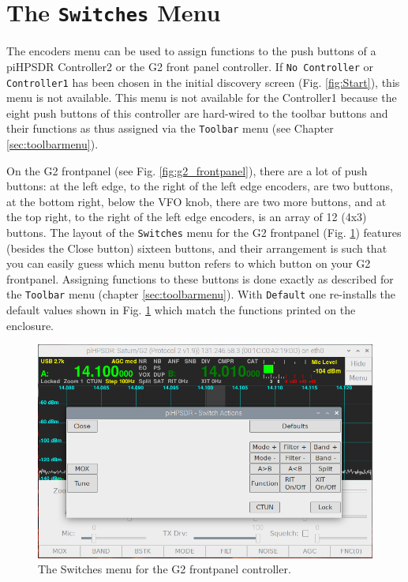 \documentclass[12pt]{book}
\def\rett#1{\texttt{\color{red}#1}}
\def\bltt#1{\texttt{\color{blue}#1}}
\begin{document}
\section{The \texttt{Switches} Menu}

The encoders menu can be used to assign functions to the push buttons of a
piHPSDR  Controller2 or the G2 front panel controller.
If \texttt{No Controller} or \texttt{Controller1} has been chosen in the initial discovery screen
(Fig. \ref{fig:Start}), this menu is not available. This menu is not available
for the Controller1 because the eight push buttons of this controller are hard-wired to
the toolbar buttons and their functions as thus assigned via the \bltt{Toolbar} menu
(see Chapter \ref{sec:toolbarmenu}).

On the G2 frontpanel (see Fig. \ref{fig:g2_frontpanel}),
 there are a lot of push buttons: at the left edge, to the right
of the left edge encoders, are two buttons, at the bottom right, below the VFO knob,
there are two more buttons, and at the top right, to the right of the left edge
encoders, is an array of 12 (4x3) buttons. The layout of the \bltt{Switches} menu
for the G2 frontpanel (Fig. \ref{fig:SwitchMenuG2}) features (besides the Close
button) sixteen buttons, and their arrangement is such that you can easily guess
which menu button refers to which button on your G2 frontpanel. Assigning functions
to these buttons is done exactly as described for the \bltt{Toolbar} menu
(chapter \ref{sec:toolbarmenu}). With \rett{Default} one re-installs the default values
shown in Fig. \ref{fig:SwitchMenuG2} which match the functions printed on the enclosure.

\begin{figure}[ht]
\center
\includegraphics[width=12cm]{SwitchMenuG2.png}
\caption{The Switches menu for the G2 frontpanel controller.}
\label{fig:SwitchMenuG2}
\end{figure}
\end{document}

